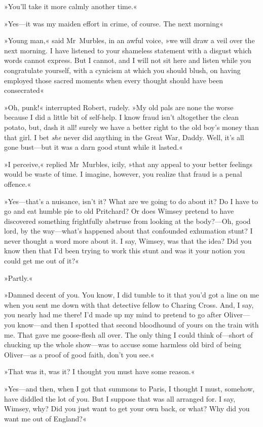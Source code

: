 »You'll take it more calmly another time.«

»Yes—it was my maiden effort in crime, of course. The next morning\longdash«

»Young man,« said Mr~Murbles, in an awful voice, »we will draw a veil over the next morning. I have listened to your shameless statement with a disgust which words cannot express. But I cannot, and I will not sit here and listen while you congratulate yourself, with a cynicism at which you should blush, on having employed those sacred moments when every thought should have been consecrated\longdash«

»Oh, punk!« interrupted Robert, rudely. »My old pals are none the worse because I did a little bit of self-help. I know fraud isn't altogether the clean potato, but, dash it all! surely we have a better right to the old boy's money than that girl. I bet \textit{she} never did anything in the Great War, Daddy. Well, it's all gone bust—but it was a darn good stunt while it lasted.«

»I perceive,« replied Mr~Murbles, icily, »that any appeal to your better feelings would be waste of time. I imagine, however, you realize that fraud is a penal offence.«

»Yes—that's a nuisance, isn't it? What are we going to do about it? Do I have to go and eat humble pie to old Pritchard? Or does Wimsey pretend to have discovered something frightfully abstruse from looking at the body?—Oh, good lord, by the way—what's happened about that confounded exhumation stunt? I never thought a word more about it. I say, Wimsey, was that the idea? Did you know then that I'd been trying to work this stunt and was it your notion you could get me out of it?«

»Partly.«

»Damned decent of you. You know, I did tumble to it that you'd got a line on me when you sent me down with that detective fellow to Charing Cross. And, I say, you nearly had me there! I'd made up my mind to pretend to go after Oliver—you know—and then I spotted that second bloodhound of yours on the train with me. That gave me goose-flesh all over. The only thing I could think of—short of chucking up the whole show—was to accuse some harmless old bird of being Oliver—as a proof of good faith, don't you see.«

»That was it, was it? I thought you must have some reason.«

»Yes—and then, when I got that summons to Paris, I thought I must, somehow, have diddled the lot of you. But I suppose that was all arranged for. I say, Wimsey, why? Did you just want to get your own back, or what? Why did you want me out of England?«

